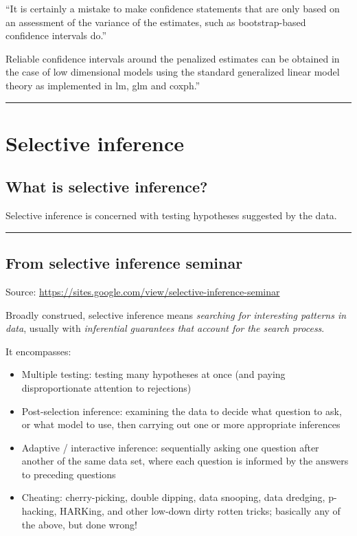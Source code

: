 \documentclass[
  letterpaper,
  DIV=11,
  numbers=noendperiod]{scrartcl}
\providecommand{\tightlist}{%
  \setlength{\itemsep}{0pt}\setlength{\parskip}{0pt}}\usepackage{longtable,booktabs,array}
\begin{document}
``It is certainly a mistake to make conﬁdence statements that are only
based on an assessment of the variance of the estimates, such as
bootstrap-based conﬁdence intervals do.''

Reliable conﬁdence intervals around the penalized estimates can be
obtained in the case of low dimensional models using the standard
generalized linear model theory as implemented in lm, glm and coxph.''

\begin{center}\rule{0.5\linewidth}{0.5pt}\end{center}

\hypertarget{selective-inference}{%
\section{Selective inference}\label{selective-inference}}

\hypertarget{what-is-selective-inference}{%
\subsection{What is selective
inference?}\label{what-is-selective-inference}}

Selective inference is concerned with testing hypotheses suggested by
the data.

\begin{center}\rule{0.5\linewidth}{0.5pt}\end{center}

\hypertarget{from-selective-inference-seminar}{%
\subsection{From selective inference
seminar}\label{from-selective-inference-seminar}}

Source: \url{https://sites.google.com/view/selective-inference-seminar}

Broadly construed, selective inference means \emph{searching for
interesting patterns in data}, usually with \emph{inferential guarantees
that account for the search process}.

It encompasses:

\begin{itemize}
\tightlist
\item
  Multiple testing: testing many hypotheses at once (and paying
  disproportionate attention to rejections)
\item
  Post-selection inference: examining the data to decide what question
  to ask, or what model to use, then carrying out one or more
  appropriate inferences
\item
  Adaptive / interactive inference: sequentially asking one question
  after another of the same data set, where each question is informed by
  the answers to preceding questions
\item
  Cheating: cherry-picking, double dipping, data snooping, data
  dredging, p-hacking, HARKing, and other low-down dirty rotten tricks;
  basically any of the above, but done wrong!
\end{itemize}
\end{document}
